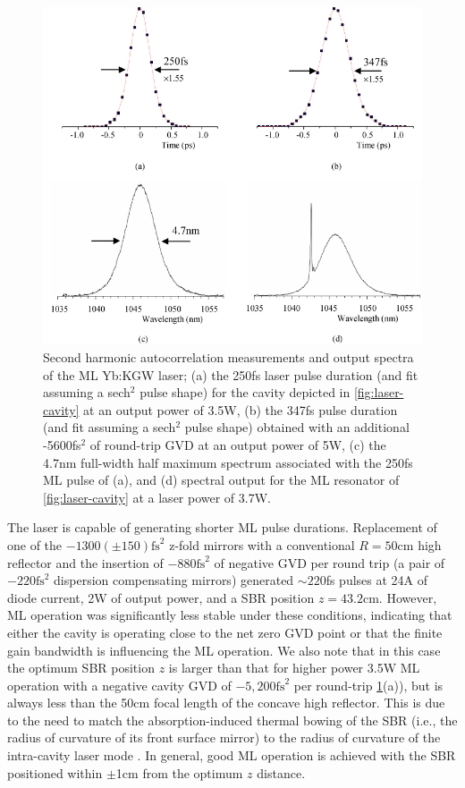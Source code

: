 \begin{figure}
  \centering
  \includegraphics{profile.jpg}
  \caption[Autocorrelation measurements of employed ultrafast laser's pulse duration]{
Second harmonic autocorrelation measurements and output spectra of the ML Yb:KGW laser; (a) the 250fs laser pulse duration (and fit assuming a sech$^2$ pulse shape) for the cavity depicted in \protect\ref{fig:laser-cavity}\protect{} at an output power of 3.5W, (b) the 347fs pulse duration (and fit assuming a sech$^2$ pulse shape) obtained with an additional -5600fs$^2$ of round-trip GVD at an output power of 5W, (c) the 4.7nm full-width half maximum spectrum associated with the 250fs ML pulse of (a), and (d) spectral output for the ML resonator of \protect\ref{fig:laser-cavity}\protect{} at a laser power of 3.7W.
  }
  \label{fig:laser-profile}
\end{figure}

The laser is capable of generating shorter ML pulse durations.
Replacement of one of the $-1300 ( \pm 150 ) \text{fs}^2$ z-fold mirrors with a conventional $R = 50$cm high reflector and the insertion of $-880\text{fs}^2$ of negative GVD per round trip (a pair of $-220\text{fs}^2$ dispersion compensating mirrors) generated $\sim220$fs pulses at 24A of diode current, 2W of output power, and a SBR position $z = 43.2$cm.
However, ML operation was significantly less stable under these conditions, indicating that either the cavity is operating close to the net zero GVD point or that the finite gain bandwidth is influencing the ML operation.
We also note that in this case the optimum SBR position $z$ is larger than that for higher power 3.5W ML operation with a negative cavity GVD of $-5,200\text{fs}^2$ per round-trip \ref{fig:laser-profile}(a)), but is always less than the 50cm focal length of the concave high reflector.
This is due to the need to match the absorption-induced thermal bowing of the SBR (i.e., the radius of curvature of its front surface mirror) to the radius of curvature of the intra-cavity laser mode \cite{Schieffer_dual_passive_2006}.
In general, good ML operation is achieved with the SBR positioned within $\pm$1cm from the optimum $z$ distance.

